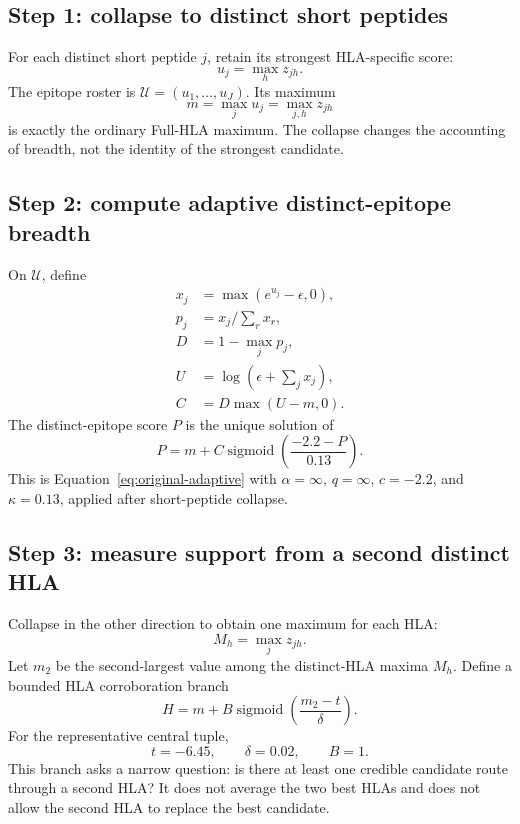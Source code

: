 \documentclass[11pt]{article}
\newcommand{\sigmoid}{\operatorname{sigmoid}}
\begin{document}
\subsection{Step 1: collapse to distinct short peptides}

For each distinct short peptide $j$, retain its strongest HLA-specific score:
\begin{equation}
u_j=\max_h z_{jh}.
\label{eq:peptide-collapse}
\end{equation}
The epitope roster is $\mathcal U=(u_1,\ldots,u_J)$. Its maximum
\begin{equation}
m=\max_j u_j=\max_{j,h}z_{jh}
\end{equation}
is exactly the ordinary Full-HLA maximum. The collapse changes the accounting
of breadth, not the identity of the strongest candidate.

\subsection{Step 2: compute adaptive distinct-epitope breadth}

On $\mathcal U$, define
\begin{align}
x_j&=\max(e^{u_j}-\epsilon,0),\\
p_j&=x_j\Big/\sum_r x_r,\\
D&=1-\max_j p_j,\\
U&=\log\!\left(\epsilon+\sum_jx_j\right),\\
C&=D\max(U-m,0).
\end{align}
The distinct-epitope score $P$ is the unique solution of
\begin{equation}
P=m+C\sigmoid\!\left(\frac{-2.2-P}{0.13}\right).
\label{eq:peptide-branch}
\end{equation}
This is Equation~\eqref{eq:original-adaptive} with
$\alpha=\infty$, $q=\infty$, $c=-2.2$, and $\kappa=0.13$, applied after
short-peptide collapse.

\subsection{Step 3: measure support from a second distinct HLA}

Collapse in the other direction to obtain one maximum for each HLA:
\begin{equation}
M_h=\max_j z_{jh}.
\end{equation}
Let $m_2$ be the second-largest value among the distinct-HLA maxima $M_h$.
Define a bounded HLA corroboration branch
\begin{equation}
H=m+B\sigmoid\!\left(\frac{m_2-t}{\delta}\right).
\label{eq:hla-branch}
\end{equation}
For the representative central tuple,
\begin{equation}
t=-6.45,\qquad \delta=0.02,\qquad B=1.
\end{equation}
This branch asks a narrow question: is there at least one credible candidate
route through a second HLA? It does not average the two best HLAs and does not
allow the second HLA to replace the best candidate.
\end{document}
